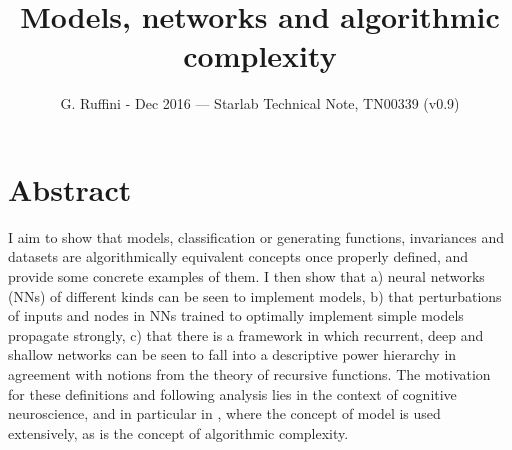 \documentclass[11pt]{amsart}
\title{Models, networks and algorithmic complexity}
\author{G. Ruffini - Dec 2016 --- Starlab Technical Note, TN00339 (v0.9)}
\begin{document}
\lstset{language=Python}          %

\maketitle
\tableofcontents
\section*{Abstract}
I  aim to show that models, classification or generating functions, invariances and datasets are algorithmically equivalent concepts once properly defined, and provide some concrete examples of them. I then  show that a)  neural networks  (NNs) of different kinds can be seen to implement models, b) that perturbations of inputs and nodes in  NNs  trained to optimally implement simple models propagate strongly,  c) that there is a framework in which recurrent, deep  and shallow networks can be seen to fall into a descriptive power hierarchy in agreement with notions from the theory of recursive functions. 
The motivation for these definitions and following analysis lies in the context of cognitive neuroscience, and in particular in   \cite{Ruffini:2016ac}, where the concept of model is used extensively, as is the concept of algorithmic complexity.  

\end{document}
